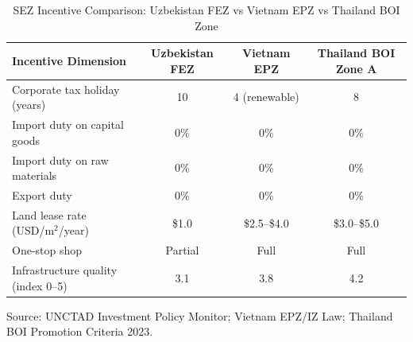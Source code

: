 \begin{table}[!h]
\centering
\caption{\label{tab:sez_incentives}SEZ Incentive Comparison: Uzbekistan FEZ vs Vietnam EPZ vs Thailand BOI Zone}
\centering
\begin{threeparttable}
\begin{tabular}[t]{lccc}
\toprule
Incentive Dimension & Uzbekistan FEZ & Vietnam EPZ & Thailand BOI Zone A\\
\midrule
Corporate tax holiday (years) & 10 & 4 (renewable) & 8\\
Import duty on capital goods & 0\% & 0\% & 0\%\\
Import duty on raw materials & 0\% & 0\% & 0\%\\
Export duty & 0\% & 0\% & 0\%\\
Land lease rate (USD/m$^2$/year) & \$1.0 & \$2.5--\$4.0 & \$3.0--\$5.0\\
\addlinespace
One-stop shop & Partial & Full & Full\\
Infrastructure quality (index 0--5) & 3.1 & 3.8 & 4.2\\
\bottomrule
\end{tabular}
\begin{tablenotes}
\item Source: UNCTAD Investment Policy Monitor; Vietnam EPZ/IZ Law; Thailand BOI Promotion Criteria 2023.
\end{tablenotes}
\end{threeparttable}
\end{table}

